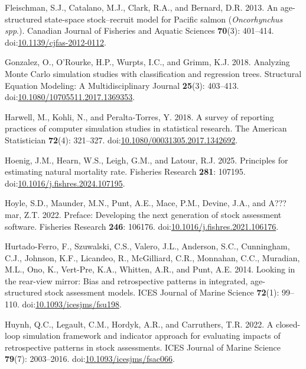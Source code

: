 \begin{CSLReferences}{1}{0}
Fleischman, S.J., Catalano, M.J., Clark, R.A., and Bernard, D.R. 2013.
An age-structured state-space stock--recruit model for {P}acific salmon
(\emph{{O}ncorhynchus spp}.). Canadian Journal of Fisheries and Aquatic
Sciences \textbf{70}(3): 401--414.
doi:\href{https://doi.org/10.1139/cjfas-2012-0112}{10.1139/cjfas-2012-0112}.

Gonzalez, O., O'Rourke, H.P., Wurpts, I.C., and Grimm, K.J. 2018.
Analyzing {M}onte {C}arlo simulation studies with classification and
regression trees. Structural Equation Modeling: A Multidisciplinary
Journal \textbf{25}(3): 403--413.
doi:\href{https://doi.org/10.1080/10705511.2017.1369353}{10.1080/10705511.2017.1369353}.

Harwell, M., Kohli, N., and Peralta-Torres, Y. 2018. A survey of
reporting practices of computer simulation studies in statistical
research. The American Statistician \textbf{72}(4): 321--327.
doi:\href{https://doi.org/10.1080/00031305.2017.1342692}{10.1080/00031305.2017.1342692}.

Hoenig, J.M., Hearn, W.S., Leigh, G.M., and Latour, R.J. 2025.
Principles for estimating natural mortality rate. Fisheries Research
\textbf{281}: 107195.
doi:\href{https://doi.org/10.1016/j.fishres.2024.107195}{10.1016/j.fishres.2024.107195}.

Hoyle, S.D., Maunder, M.N., Punt, A.E., Mace, P.M., Devine, J.A., and
A???mar, Z.T. 2022. Preface: Developing the next generation of stock
assessment software. Fisheries Research \textbf{246}: 106176.
doi:\href{https://doi.org/10.1016/j.fishres.2021.106176}{10.1016/j.fishres.2021.106176}.

Hurtado-Ferro, F., Szuwalski, C.S., Valero, J.L., Anderson, S.C.,
Cunningham, C.J., Johnson, K.F., Licandeo, R., McGilliard, C.R.,
Monnahan, C.C., Muradian, M.L., Ono, K., Vert-Pre, K.A., Whitten, A.R.,
and Punt, A.E. 2014. Looking in the rear-view mirror: Bias and
retrospective patterns in integrated, age-structured stock assessment
models. ICES Journal of Marine Science \textbf{72}(1): 99--110.
doi:\href{https://doi.org/10.1093/icesjms/fsu198}{10.1093/icesjms/fsu198}.

Huynh, Q.C., Legault, C.M., Hordyk, A.R., and Carruthers, T.R. 2022. A
closed-loop simulation framework and indicator approach for evaluating
impacts of retrospective patterns in stock assessments. ICES Journal of
Marine Science \textbf{79}(7): 2003--2016.
doi:\href{https://doi.org/10.1093/icesjms/fsac066}{10.1093/icesjms/fsac066}.


\end{CSLReferences}
